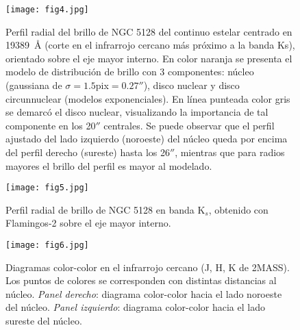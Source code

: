 \documentclass[baaa]{baaa}
\begin{document}
\begin{figure}[!t]
\centering
\texttt{[image: fig4.jpg]}
\caption{Perfil radial del brillo de NGC 5128 del continuo estelar centrado en 19389\textup{~\AA} (corte en el infrarrojo cercano más próximo a la banda Ks), orientado  sobre el eje mayor interno. En color naranja se presenta el modelo de distribución de brillo con 3 componentes: núcleo (gaussiana de $\sigma=1.5$pix$=0.27''$), disco nuclear y disco circunnuclear (modelos exponenciales). En línea punteada color gris se demarcó el disco nuclear, visualizando la importancia de tal componente en los 20$''$ centrales. Se puede observar que el perfil ajustado del lado izquierdo (noroeste) del núcleo queda por encima del perfil derecho (sureste) hasta los 26$''$, mientras que para radios mayores el brillo del perfil es mayor al modelado.}

\label{Figura4}
\end{figure}

\begin{figure}[!t]
\centering
\texttt{[image: fig5.jpg]}
\caption{Perfil radial de brillo de NGC 5128 en banda K$_{s}$, obtenido con Flamingos-2 sobre el eje mayor interno.}
\end{figure}


\begin{figure*}[!t]
\centering
\texttt{[image: fig6.jpg]}
\caption{Diagramas color-color en el infrarrojo cercano (J, H, K de 2MASS). Los puntos de colores se corresponden con distintas distancias al núcleo.
\textit{Panel derecho}: diagrama color-color hacia el lado noroeste del núcleo. \textit{Panel izquierdo}: diagrama color-color hacia el lado sureste del núcleo.
}
\label{Figura6}
\end{figure*}
\end{document}
